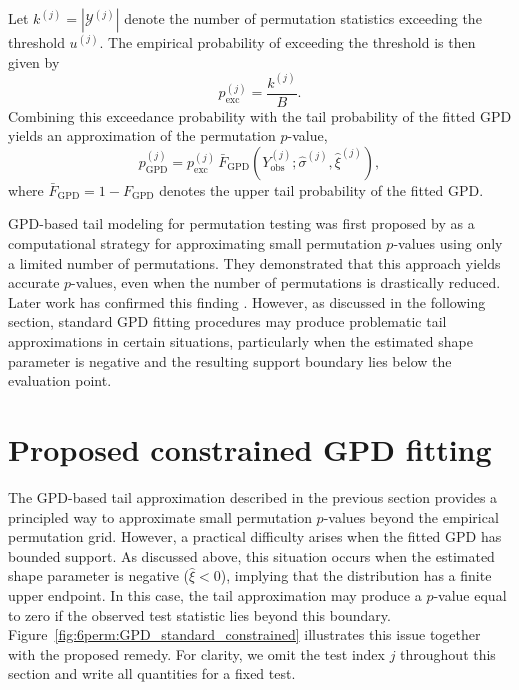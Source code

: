 Let $k^{(j)} = |\mathcal{Y}^{(j)}|$ denote the number of permutation statistics exceeding the threshold $u^{(j)}$. The empirical probability of exceeding the threshold is then given by
\[
p_{\mathrm{exc}}^{(j)} = \frac{k^{(j)}}{B}.
\]
Combining this exceedance probability with the tail probability of the fitted GPD yields an approximation of the permutation $p$-value,
\begin{equation}
\label{eq:6perm:GPD_pvalue}
p_{\mathrm{GPD}}^{(j)} =
p_{\mathrm{exc}}^{(j)}
\,
\bar{F}_{\mathrm{GPD}}\!\left(
Y_{\mathrm{obs}}^{(j)};
\hat{\sigma}^{(j)},\hat{\xi}^{(j)}
\right),
\end{equation}
where $\bar{F}_{\mathrm{GPD}} = 1 - F_{\mathrm{GPD}}$ denotes the upper tail probability of the fitted GPD.

GPD-based tail modeling for permutation testing was first proposed by \citet{knijnenburg2009fewer} as a computational strategy for approximating small permutation $p$-values using only a limited number of permutations. They demonstrated that this approach yields accurate $p$-values, even when the number of permutations is drastically reduced. Later work has confirmed this finding \citep{winkler2016faster}. However, as discussed in the following section, standard GPD fitting procedures may produce problematic tail approximations in certain situations, particularly when the estimated shape parameter is negative and the resulting support boundary lies below the evaluation point.


\section{Proposed constrained GPD fitting}
\label{sec:6perm:constraint}

The GPD-based tail approximation described in the previous section provides a principled way to approximate small permutation $p$-values beyond the empirical permutation grid. However, a practical difficulty arises when the fitted GPD has bounded support. As discussed above, this situation occurs when the estimated shape parameter is negative ($\hat{\xi}<0$), implying that the distribution has a finite upper endpoint. In this case, the tail approximation may produce a $p$-value equal to zero if the observed test statistic lies beyond this boundary. Figure~\ref{fig:6perm:GPD_standard_constrained} illustrates this issue together with the proposed remedy. For clarity, we omit the test index $j$ throughout this section and write all quantities for a fixed test.


